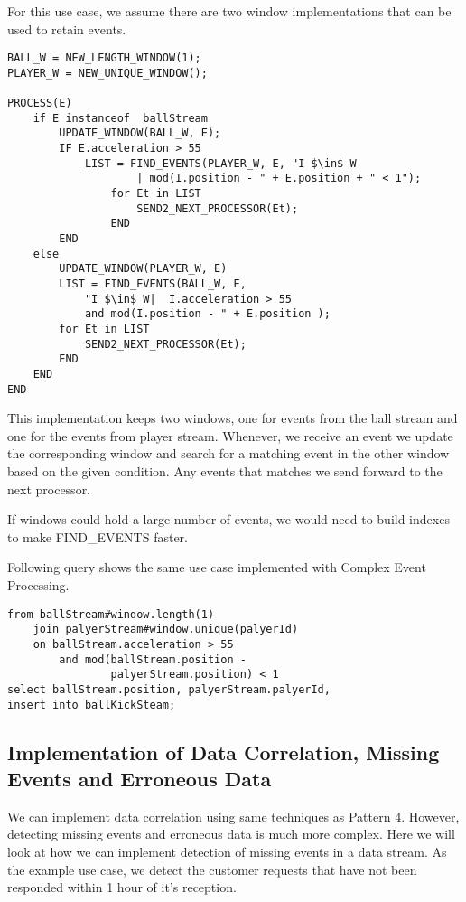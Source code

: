 \documentclass{sig-alternate}
\begin{document}
{For this use case, we assume there are two window implementations that can be used to retain events. 

\begin{lstlisting}[mathescape, showstringspaces=false]
BALL_W = NEW_LENGTH_WINDOW(1); 
PLAYER_W = NEW_UNIQUE_WINDOW();

PROCESS(E)
	if E instanceof  ballStream
		UPDATE_WINDOW(BALL_W, E);
		IF E.acceleration > 55
    		LIST = FIND_EVENTS(PLAYER_W, E, "I $\in$ W
    				| mod(I.position - " + E.position + " < 1");
				for Et in LIST
					SEND2_NEXT_PROCESSOR(Et);
				END	
		END
	else
		UPDATE_WINDOW(PLAYER_W, E)
		LIST = FIND_EVENTS(BALL_W, E,
			"I $\in$ W|  I.acceleration > 55
			and mod(I.position - " + E.position );
		for Et in LIST
			SEND2_NEXT_PROCESSOR(Et);
		END
	END
END  
\end{lstlisting}


 

This implementation keeps two windows, one for events from the ball stream and one for the events from player stream. Whenever, we receive an event we update the corresponding window and search for a matching event in the other window based on the given condition. Any events that matches we send forward to the next processor. 

If windows could hold a large number of events, we would need to build indexes to make FIND\_EVENTS faster. 

Following query shows the same use case implemented with Complex Event Processing.  


\begin{lstlisting}[mathescape]
from ballStream#window.length(1) 
	join palyerStream#window.unique(palyerId)
	on ballStream.acceleration > 55 
		and mod(ballStream.position - 
				palyerStream.position) < 1
select ballStream.position, palyerStream.palyerId,
insert into ballKickSteam;
\end{lstlisting}



\subsection{Implementation of Data Correlation, Missing Events and Erroneous Data}

We can implement data correlation using same techniques as Pattern 4. However, detecting missing events and erroneous data is much more complex. Here we will look at how we can implement detection of missing events in a data stream. As the example use case, we detect the customer requests that have not been responded within 1 hour of it's reception.  


}
\end{document}
